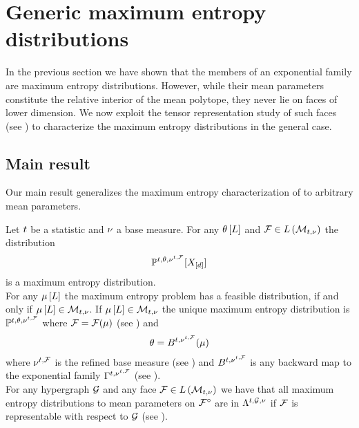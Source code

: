 \section{Generic maximum entropy distributions}\label{sec:genMaxEnt}

In the previous section we have shown that the members of an exponential family are maximum entropy distributions.
However, while their mean parameters constitute the relative interior of the mean polytope, they never lie on faces of lower dimension.
We now exploit the tensor representation study of such faces (see ) to characterize the maximum entropy distributions in the general case.

\subsection{Main result}

Our main result generalizes the maximum entropy characterization of  to arbitrary mean parameters.

\begin{theorem}
    \label{the:MAINgenMaxEntChar}
    Let $t$ be a statistic and $\nu$ a base measure.
    For any $\theta\left[L\right]$ and $\mathcal{F}\in L\left(\mathcal{M}_{t,\nu}\right)$ the distribution
    \begin{align*}
        \mathbb{P}^{t,\theta,\nu^{t,\mathcal{F}}}[X_{[d]}]
    \end{align*}
    is a maximum entropy distribution. \\
    For any $\mu\left[L\right]$ the maximum entropy problem has a feasible distribution, if and only if $\mu\left[L\right]\in\mathcal{M}_{t,\nu}$.
    If $\mu\left[L\right]\in\mathcal{M}_{t,\nu}$ the unique maximum entropy distribution is $\mathbb{P}^{t,\theta,\nu^{t,\mathcal{F}}}$ where $\mathcal{F}=\mathcal{F}(\mu)$ (see ) and
    \begin{align*}
        \theta
        = B^{t,\nu^{t,\mathcal{F}}}(\mu)
    \end{align*}
    where $\nu^{t,\mathcal{F}}$ is the refined base measure (see ) and $B^{t,\nu^{t,\mathcal{F}}}$ is any backward map to the exponential family $\Gamma^{t,\nu^{t,\mathcal{F}}}$ (see ). \\
    For any hypergraph $\mathcal{G}$ and any face $\mathcal{F}\in L\left(\mathcal{M}_{t,\nu}\right)$ we have that all maximum entropy distributions to mean parameters on ${\mathcal{F}}^{\circ}$ are in $\Lambda^{t,\mathcal{G},\nu}$ if $\mathcal{F}$ is representable with respect to $\mathcal{G}$ (see ).
\end{theorem}


